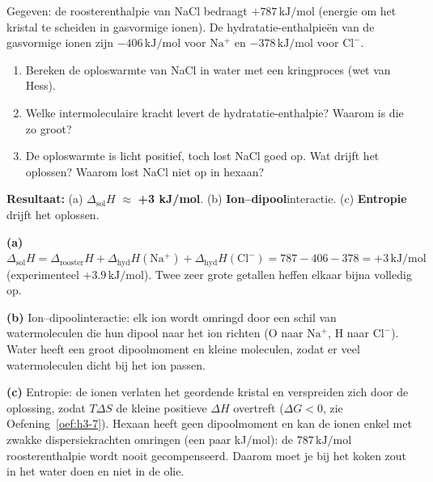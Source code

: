 \begin{oefening}
Gegeven: de roosterenthalpie van NaCl bedraagt \(+787\,\mathrm{kJ/mol}\) (energie om het kristal te scheiden in gasvormige ionen). De hydratatie-enthalpieën van de gasvormige ionen zijn \(-406\,\mathrm{kJ/mol}\) voor \(\mathrm{Na^+}\) en \(-378\,\mathrm{kJ/mol}\) voor \(\mathrm{Cl^-}\).

\begin{enumerate}
\item[(a)]
  Bereken de oploswarmte van NaCl in water met een kringproces (wet van Hess).
\item[(b)]
  Welke intermoleculaire kracht levert de hydratatie-enthalpie? Waarom is die zo groot?
\item[(c)]
  De oploswarmte is licht positief, toch lost NaCl goed op. Wat drijft het oplossen? Waarom lost NaCl niet op in hexaan?
\end{enumerate}
\end{oefening}
\begin{oplossing}
\textbf{Resultaat:} (a) \(\Delta_{\text{sol}}H\) \ensuremath{\approx{}} \textbf{+3 kJ/mol}. (b) \textbf{Ion--dipool}interactie. (c) \textbf{Entropie} drijft het oplossen.

\textbf{(a)} \(\Delta_{\text{sol}}H = \Delta_{\text{rooster}}H + \Delta_{\text{hyd}}H(\mathrm{Na^+}) + \Delta_{\text{hyd}}H(\mathrm{Cl^-}) = 787 - 406 - 378 = +3\,\mathrm{kJ/mol}\) (experimenteel \(+3.9\,\mathrm{kJ/mol}\)). Twee zeer grote getallen heffen elkaar bijna volledig op.

\textbf{(b)} Ion--dipoolinteractie: elk ion wordt omringd door een schil van watermoleculen die hun dipool naar het ion richten (O naar \(\mathrm{Na^+}\), H naar \(\mathrm{Cl^-}\)). Water heeft een groot dipoolmoment en kleine moleculen, zodat er veel watermoleculen dicht bij het ion passen.

\textbf{(c)} Entropie: de ionen verlaten het geordende kristal en verspreiden zich door de oplossing, zodat \(T\Delta S\) de kleine positieve \(\Delta H\) overtreft (\(\Delta G < 0\), zie Oefening~\ref{oef:h3-7}). Hexaan heeft geen dipoolmoment en kan de ionen enkel met zwakke dispersiekrachten omringen (een paar kJ/mol): de \(787\,\mathrm{kJ/mol}\) roosterenthalpie wordt nooit gecompenseerd. Daarom moet je bij het koken zout in het water doen en niet in de olie.
\end{oplossing}

